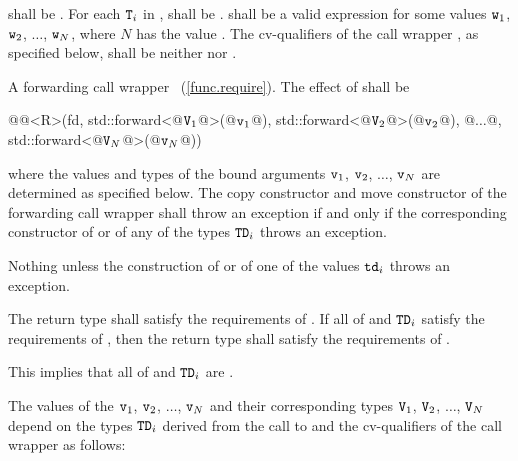 \begin{itemdescr}
\pnum
\requires
{} shall be . For each $\texttt{T}_i$
in ,  shall be .
 shall be  a valid
expression for some
values $\texttt{w}_1$, $\texttt{w}_2$, $\dotsc$, $\texttt{w}_N$, where
$N$ has the value .
The cv-qualifiers \cv{} of the call wrapper ,
as specified below, shall be neither  nor .

\pnum
\returns
A forwarding call wrapper ~(\ref{func.require}).
The effect of
 shall be
\begin{codeblock}
@@<R>(fd, std::forward<@$\texttt{V}_1$@>(@$\texttt{v}_1$@), std::forward<@$\texttt{V}_2$@>(@$\texttt{v}_2$@), @$\dotsc$@, std::forward<@$\texttt{V}_N$@>(@$\texttt{v}_N$@))
\end{codeblock}
where the values and types of the bound
arguments $\texttt{v}_1$, $\texttt{v}_2$, $\dotsc$, $\texttt{v}_N$ are determined as specified below.
The copy constructor and move constructor of the forwarding call wrapper shall throw an
exception if and only if the corresponding constructor of  or of any of the types
$\texttt{TD}_i$ throws an exception.

\pnum
\throws Nothing unless the construction of
 or of one of the values $\texttt{td}_i$ throws an exception.

\pnum
\remarks The return type shall satisfy the requirements of . If all
of  and $\texttt{TD}_i$ satisfy the requirements of , then the
return type shall satisfy the requirements of . \begin{note} This implies
that all of  and $\texttt{TD}_i$ are . \end{note}
\end{itemdescr}

\pnum
{}%
The values of the  $\texttt{v}_1$, $\texttt{v}_2$, $\dotsc$, $\texttt{v}_N$ and their
corresponding types $\texttt{V}_1$, $\texttt{V}_2$, $\dotsc$, $\texttt{V}_N$ depend on the
types $\texttt{TD}_i$ derived from
the call to  and the
cv-qualifiers \cv{} of the call wrapper  as follows:

